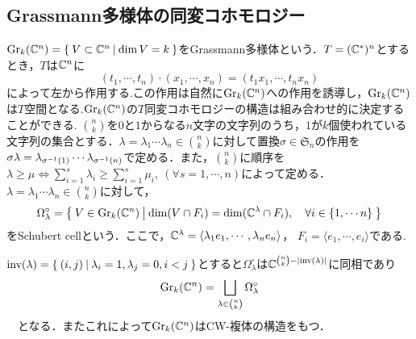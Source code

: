 \subsection{Grassmann多様体の同変コホモロジー}
$\text{Gr}_k(\mathbb{C}^n)=\left\{\:V\subset \mathbb{C}^n\:\middle|\:\dim V = k\:\right\}$をGrassmann多様体という．$T=(\mathbb{C}^*)^n$とするとき，$T$は$\mathbb{C}^n$に
\[
(t_1,\cdots,t_n)\cdot(x_1,\cdots,x_n)=(t_1x_1,\cdots,t_nx_n)
\]
によって左から作用する.この作用は自然に$\text{Gr}_k(\mathbb{C}^n)$への作用を誘導し，$\text{Gr}_k(\mathbb{C}^n)$は$T$空間となる.$\text{Gr}_k(\mathbb{C}^n)$の$T$同変コホモロジーの構造は組み合わせ的に決定することができる.
$\binom{n}{k}$を$0$と$1$からなる$n$文字の文字列のうち，$1$が$k$個使われている文字列の集合とする．$\lambda=\lambda_1\cdots \lambda_n\in\binom{n}{k}$に対して置換$\sigma\in\mathfrak{S}_n$の作用を$\sigma\lambda=\lambda_{\sigma^{-1}(1)}\cdots\lambda_{\sigma^{-1}(n)}$で定める．また，$\binom{n}{k}$に順序を$\lambda\geq\mu\Leftrightarrow \sum_{i=1}^s\lambda_i\geq\sum_{i=1}^s\mu_i,\:(\forall s = 1,\cdots,n)$によって定める．
$\lambda=\lambda_1\cdots \lambda_n\in\binom{n}{k}$に対して，
\[
\Omega_\lambda^\circ=\left\{\:V\in \text{Gr}_k(\mathbb{C}^n)\:\middle|\:\dim(V\cap F_i)= \dim(\mathbb{C}^{\lambda}\cap F_i),\quad \forall i\in \{1,\cdots n\}\:\right\}
\]
をSchubert cellという．ここで，$\mathbb{C}^{\lambda}=\langle\lambda_{1}e_{1},\cdots,\lambda_ne_n\rangle$， $F_i=\langle e_{1},\cdots,e_i\rangle$である. 

\begin{prop}
  $\text{inv}(\lambda)=\left\{\:(i,j)\:\middle|\:\lambda_i=1, \lambda_j=0, i<j\:\right\}$とすると$\Omega_\lambda^\circ$は$\mathbb{C}^{\binom{n}{k}-|\text{inv}(\lambda)|}$に同相であり
\begin{equation}\label{CW str of grassmannian}
\text{Gr}_k(\mathbb{C}^n)=\bigsqcup_{\lambda\in\binom{n}{k}}\Omega_\lambda^\circ
\end{equation}
　となる．またこれによって$\text{Gr}_k(\mathbb{C}^n)$はCW-複体の構造をもつ．
\end{prop}

